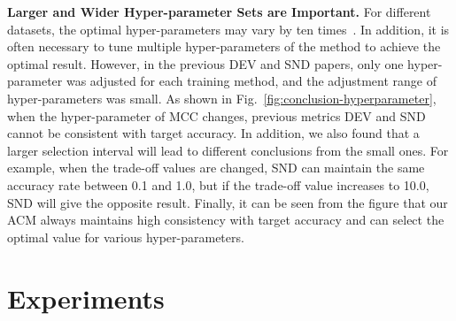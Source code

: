 \documentclass{article} %
\begin{document}
\textbf{Larger and Wider Hyper-parameter Sets are Important.}
For different datasets, the optimal hyper-parameters may vary by ten times~\cite{tllib}. In addition, it is often necessary to tune multiple hyper-parameters of the method to achieve the optimal result. However, in the previous DEV and SND papers, only one hyper-parameter was adjusted for each training method, and the adjustment range of hyper-parameters was small.
As shown in Fig.~\ref{fig:conclusion-hyperparameter}, when the hyper-parameter of MCC changes, previous metrics DEV and SND cannot be consistent with target accuracy. In addition, we also found that a larger selection interval will lead to different conclusions from the small ones. For example, when the trade-off values are changed, SND can maintain the same accuracy rate between 0.1 and 1.0, but if the trade-off value increases to 10.0, SND will give the opposite result. Finally, it can be seen from the figure that our ACM always maintains high consistency with target accuracy and can select the optimal value for various hyper-parameters.


\section{Experiments}

\end{document}
